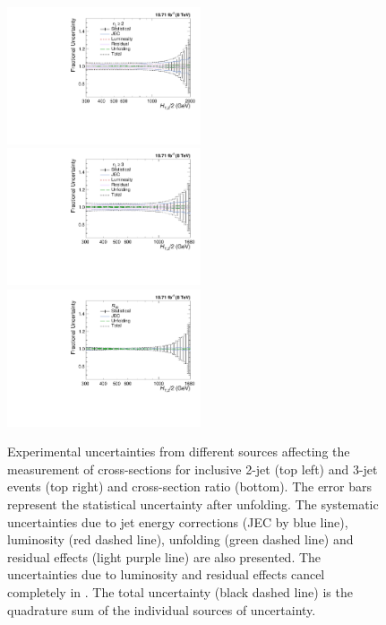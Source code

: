 \begin{figure}[!h]
 \begin{center}
 \hspace*{-3mm}\includegraphics[width=0.51\textwidth]{Plots_HT_2_150/Total_unc_all_2_NLO_add.pdf}%
 ~~\includegraphics[width=0.51\textwidth]{Plots_HT_2_150/Total_unc_all_3_NLO_add.pdf}\\
 \includegraphics[width=0.51\textwidth]{Plots_HT_2_150/Total_Unc_ratio_32_direct_add.pdf}
 \caption{Experimental uncertainties from different sources affecting the measurement of cross-sections for inclusive 2-jet (top left) and 3-jet events (top right) and cross-section ratio \ratio (bottom). The error bars represent the statistical uncertainty after unfolding. The systematic uncertainties due to jet energy corrections (JEC by blue line), luminosity (red dashed line), unfolding (green dashed line) and residual effects (light purple line) are also presented. The uncertainties due to luminosity and residual effects cancel completely in \ratio. The total uncertainty (black dashed line) is the quadrature sum of the individual sources of uncertainty.}
 \label{fig:exp_unc}
 \end{center}
\end{figure}


